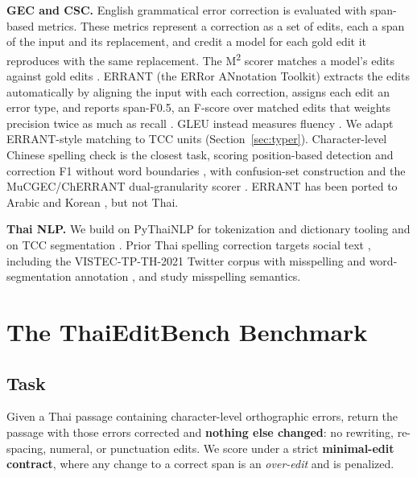 \documentclass[11pt]{article}
\begin{document}
\noindent\textbf{GEC and CSC.} English grammatical error correction is evaluated with
span-based metrics. These metrics represent a correction as a set of edits, each a span of the
input and its replacement, and credit a model for each gold edit it reproduces with the same
replacement. The M\textsuperscript{2} scorer matches a model's edits against gold edits
\citep{dahlmeier-ng-2012-better}. ERRANT (the ERRor ANnotation Toolkit) extracts the edits
automatically by aligning the input with each correction, assigns each edit an error type, and
reports span-F0.5, an F-score over matched edits that weights precision twice as much as recall
\citep{bryant-etal-2017-automatic}. GLEU instead measures fluency
\citep{napoles-etal-2015-ground}. We adapt ERRANT-style matching to TCC units
(Section~\ref{sec:typer}). Character-level Chinese spelling check is the closest task, scoring
position-based detection and correction F1 without word boundaries
\citep{tseng-etal-2015-introduction,wu-etal-2013-chinese,yu-etal-2014-overview}, with
confusion-set construction \citep{liu-etal-2011-visually} and the MuCGEC/ChERRANT
dual-granularity scorer \citep{zhang-etal-2022-mucgec}. ERRANT has been ported to Arabic
\citep{belkebir-habash-2021-automatic} and Korean \citep{yoon-etal-2023-towards}, but not Thai.

\noindent\textbf{Thai NLP.} We build on PyThaiNLP for tokenization and dictionary tooling
\citep{phatthiyaphaibun-etal-2023-pythainlp} and on TCC segmentation
\citep{theeramunkong-etal-2000-character}. Prior Thai spelling correction
targets social text \citep{lertpiya-etal-2020-thai,lertpiya-etal-2023-progressively},
including the VISTEC-TP-TH-2021 Twitter corpus with misspelling and word-segmentation
annotation \citep{limkonchotiwat-etal-2021-handling}, and \citet{nakwijit-purver-2022-misspelling}
study misspelling semantics.

\section{The ThaiEditBench Benchmark}

\subsection{Task}
Given a Thai passage containing character-level orthographic errors, return the passage with
those errors corrected and \textbf{nothing else changed}: no rewriting, re-spacing, numeral,
or punctuation edits. We score under a strict \textbf{minimal-edit contract}, where any change
to a correct span is an \emph{over-edit} and is penalized.
\end{document}
